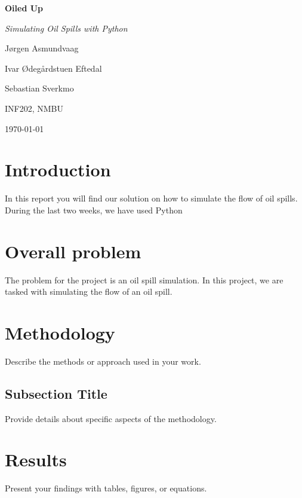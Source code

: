 \documentclass[a4paper,12pt]{article}
\begin{document}
\begin{titlepage}
    \centering
    \vspace*{2cm} %
    {\Huge\bfseries Oiled Up \par} %
    \vspace{0.5cm}
    {\Large\itshape Simulating Oil Spills with Python \par} %
    \vspace{2cm}
    {\Large J\o rgen Asmundvaag \par} %
    {\Large Ivar \O deg\aa rdstuen Eftedal \par} %
    {\Large Sebastian Sverkmo \par} 
    \vspace{1cm}
    {\large INF202, NMBU \par} %
    \vfill
    {\large \today} %
    \vspace*{1cm}
\end{titlepage}

\tableofcontents
\newpage

\section*{Introduction}
In this report you will find our solution on how to simulate the flow of oil spills. 
During the last two weeks, we have used Python

\section*{Overall problem}
The problem for the project is an oil spill simulation. In this project, we are tasked with simulating the flow of an oil spill.

\section{Methodology}
Describe the methods or approach used in your work.



\subsection{Subsection Title}
Provide details about specific aspects of the methodology.

\section{Results}
Present your findings with tables, figures, or equations.
\end{document}
